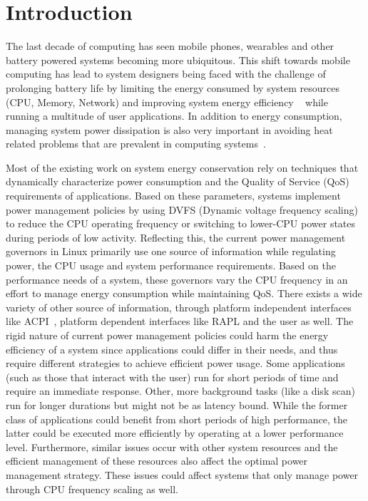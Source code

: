 \section{Introduction}\label{sec:intro}\label{sec:motiv}

The last decade of computing has seen mobile phones, wearables and other battery powered systems becoming 
more ubiquitous. This shift towards mobile computing has lead to system designers being faced with the  
challenge of prolonging battery life by limiting the energy consumed  
by system resources (CPU, Memory, Network) and improving system energy efficiency ~\cite{martin-bat, worldwide} while running a multitude of user applications. 
In addition to energy consumption, managing system power dissipation is also very 
important in avoiding heat related problems that are prevalent in computing systems~\cite{hybdtm}.

Most of the existing work on system energy conservation rely on techniques that  
dynamically characterize power consumption and the Quality of Service (QoS) requirements 
of applications. Based on these parameters, systems implement power management policies by 
using DVFS (Dynamic voltage frequency scaling)~\cite{dvfs} to reduce the CPU operating frequency or switching to lower-CPU power states~\cite{sleepscale, ecos} during periods of low activity.
Reflecting this, the current power management governors in Linux primarily use one source of 
information while regulating power, the CPU usage and system performance requirements. 
Based on the performance needs of a system, these governors vary the CPU frequency in an effort to manage energy consumption while maintaining QoS. 
There exists a wide variety of other source of information, through platform independent interfaces like ACPI~\cite{acpi, freqgov}, platform dependent interfaces like RAPL 
and the user as well. The rigid nature of current power management policies could harm the energy efficiency of a system since applications could differ in their needs, and thus 
require different strategies to achieve efficient power usage. 
Some applications (such as those that interact with the user) run for short periods of time and require an immediate response. Other, more background tasks (like a disk scan) run for longer durations 
but might not be as latency bound.
While the former class of applications could benefit from short periods of high performance, the latter could be executed more efficiently by operating at a lower performance level. 
Furthermore, similar issues occur with other system resources and the efficient management of these resources also affect the optimal power management strategy. 
These issues could affect systems that only manage power through CPU frequency scaling as well.

